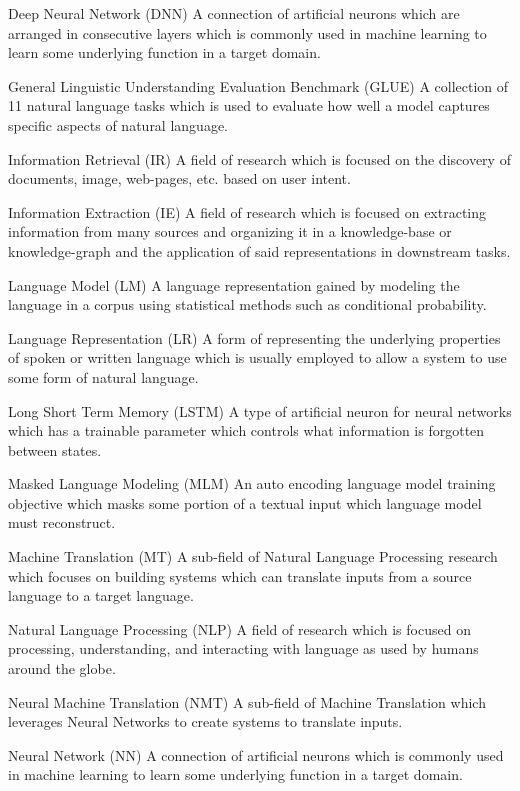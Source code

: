 \documentclass [11pt, proquest] {uwthesis}[2020/12/20]
\begin{document}
\begin{glossary}
\item[Deep Neural Network (DNN)] A connection of artificial neurons which are arranged in consecutive layers which is commonly used in machine learning to learn some underlying function in a target domain.
\item[General Linguistic Understanding Evaluation Benchmark (GLUE)] A collection of 11 natural language tasks which is used to evaluate how well a model captures specific aspects of natural language.
\item[Information Retrieval (IR)] A field of research which is focused on the discovery of documents, image, web-pages, etc. based on user intent.
\item[Information Extraction (IE)] A field of research which is focused on extracting information from many sources and organizing it in a knowledge-base or knowledge-graph and the application of said representations in downstream tasks.
\item[Language Model (LM)] A language representation gained by modeling the language in a corpus using statistical methods such as conditional probability.
\item[Language Representation (LR)] A form of representing the underlying properties of spoken or written language which is usually employed to allow a system to use some form of natural language.
\item[Long Short Term Memory (LSTM)] A type of artificial neuron for neural networks which has a trainable parameter which controls what information is forgotten between states.
\item[Masked Language Modeling (MLM)] An auto encoding language model training objective which masks some portion of a textual input which language model must reconstruct. 
\item[Machine Translation (MT)] A sub-field of Natural Language Processing research which focuses on building systems which can translate inputs from a source language to a target language.
\item[Natural Language Processing (NLP)] A field of research which is focused on processing, understanding, and interacting with language as used by humans around the globe.
\item[Neural Machine Translation (NMT)] A sub-field of Machine Translation which leverages Neural Networks to create systems to translate inputs.
\item[Neural Network (NN)] A connection of artificial neurons which is commonly used in machine learning to learn some underlying function in a target domain.

\end{glossary}
\end{document}

